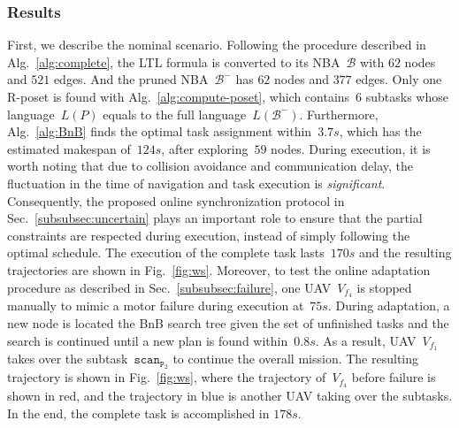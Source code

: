 \subsubsection{Results}\label{subsubsec:hw-results}
First, we describe the nominal scenario.
Following the procedure described in Alg.~\ref{alg:complete},
the LTL formula is converted to its NBA~$\mathcal{B}$ with $62$ nodes and $521$ edges.
And the pruned NBA~$\mathcal{B}^-$ has $62$ nodes and $377$ edges.
Only one R-poset is found with Alg.~\ref{alg:compute-poset},
which contains~$6$ subtasks whose language~$L(P)$ equals to the full language~$L(\mathcal{B}^-)$.
Furthermore, Alg.~\ref{alg:BnB} finds the
optimal task assignment within~$3.7s$,
which has the estimated makespan of~$124s$, after exploring~$59$ nodes.
During execution, it is worth noting that due to collision avoidance and communication delay,
the fluctuation in the time of navigation and task execution is \emph{significant}.
Consequently, the proposed online synchronization protocol in Sec.~\ref{subsubsec:uncertain}
plays an important role to ensure that the partial constraints
are respected during execution,
instead of simply following the optimal schedule.
The execution of the complete task lasts~$170s$ and
the resulting trajectories are shown in Fig.~\ref{fig:ws}.
Moreover, to test the online adaptation procedure
as described in Sec.~\ref{subsubsec:failure},
one UAV~$V_{f_4}$ is stopped manually to mimic a motor failure during execution at~$75s$.
During adaptation, a new node is located the BnB search tree
given the set of unfinished tasks
and the search is continued until a new plan is found within~$0.8s$.
As a result, UAV~$V_{f_1}$ takes over the subtask~$\texttt{scan}_{\texttt{P}_2}$
to continue the overall mission.
The resulting trajectory is shown in Fig.~\ref{fig:ws},
where the trajectory of~$V_{f_4}$ before failure is shown in red,
and the trajectory in blue is another UAV taking over the subtasks.
In the end, the complete task is accomplished in $178s$.


